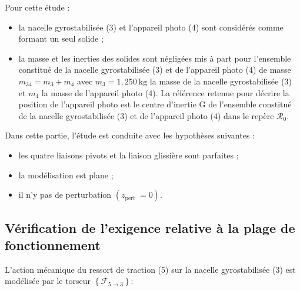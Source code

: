 Pour cette étude :

\begin{itemize}
  \item la nacelle gyrostabilisée (3) et l'appareil photo (4) sont considérés comme formant un seul solide ;
  \item la masse et les inerties des solides sont négligées mis à part pour l'ensemble constitué de la nacelle gyrostabilisée (3) et de l'appareil photo (4) de masse $m_{34}=m_{3}+m_{4}$ avec $m_{3}=1,250 \mathrm{~kg}$ la masse de la nacelle gyrostabilisée (3) et $m_{4}$ la masse de l'appareil photo (4). La référence retenue pour décrire la position de l'appareil photo est le centre d'inertie $\mathrm{G}$ de l'ensemble constitué de la nacelle gyrostabilisée (3) et de l'appareil photo (4) dans le repère $\mathcal{R}_{0}$.

\end{itemize}


Dans cette partie, l'étude est conduite avec les hypothèses suivantes :
\begin{itemize}
  \item les quatre liaisons pivots et la liaison glissière sont parfaites ;
  \item la modélisation est plane ;
  \item il n'y pas de perturbation $\left(z_{\text {pert }}=0\right)$.
\end{itemize}

\ifprof
\begin{corrige}
\end{corrige}
\else
\fi

\ifprof
\begin{corrige}
\end{corrige}
\else
\fi

\ifprof
\begin{corrige}
\end{corrige}
\else
\fi

\subsection{Vérification de l'exigence relative à la plage de fonctionnement}
L'action mécanique du ressort de traction (5) sur la nacelle gyrostabilisée (3) est modélisée par le torseur $\left\{\mathcal{F}_{5 \rightarrow 3}\right\}:$

